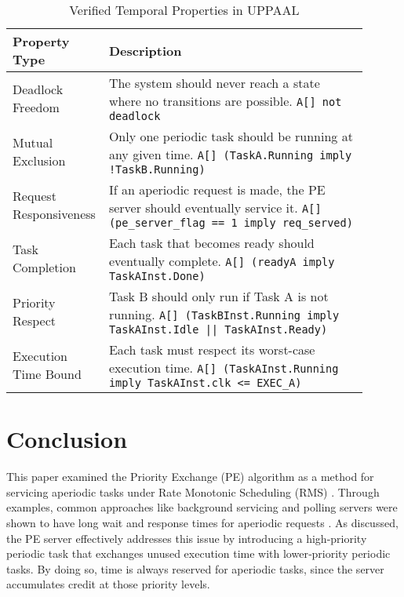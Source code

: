 \documentclass[conference]{IEEEtran}
\begin{document}
\begin{table}[H]
\centering
\caption{Verified Temporal Properties in UPPAAL}
\begin{tabular}{|p{0.18\linewidth}|p{0.72\linewidth}|}
\hline
\textbf{Property Type} & \textbf{Description} \\
\hline
Deadlock Freedom & The system should never reach a state where no transitions are possible. \newline \texttt{A[] not deadlock} \\
\hline
Mutual Exclusion & Only one periodic task should be running at any given time. \newline \texttt{A[] (TaskA.Running imply !TaskB.Running)} \\
\hline
Request Responsiveness & If an aperiodic request is made, the PE server should eventually service it. \newline \texttt{A[] (pe\_server\_flag == 1 imply req\_served)} \\
\hline
Task Completion & Each task that becomes ready should eventually complete. \newline \texttt{A[] (readyA imply TaskAInst.Done)} \\
\hline
Priority Respect & Task B should only run if Task A is not running. \newline \texttt{A[] (TaskBInst.Running imply TaskAInst.Idle || TaskAInst.Ready)} \\
\hline
Execution Time Bound & Each task must respect its worst-case execution time. \newline \texttt{A[] (TaskAInst.Running imply TaskAInst.clk \textless= EXEC\_A)} \\
\hline
\end{tabular}
\label{tab:temporal_properties}
\end{table}

\section{Conclusion}
This paper examined the Priority Exchange (PE) algorithm as a method for servicing aperiodic tasks under Rate Monotonic Scheduling (RMS) \cite{lehoczky1987enhanced}. Through examples, common approaches like background servicing and polling servers were shown to have long wait and response times for aperiodic requests \cite{sprunt1990aperiodic}. As discussed, the PE server effectively addresses this issue by introducing a high‐priority periodic task that exchanges unused execution time with lower‐priority periodic tasks. By doing so, time is always reserved for aperiodic tasks, since the server accumulates credit at those priority levels.
\end{document}
